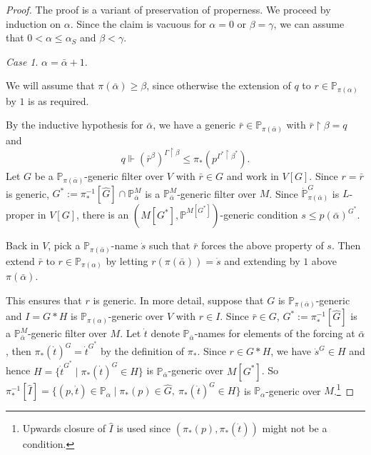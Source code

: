 \documentclass[a4paper, 11pt]{amsart}
\theoremstyle{remark}
\newtheorem*{case*}{Case}
\newcommand{\PP}{\mathbb{P}}
\begin{document}
\begin{proof} 
The proof is a variant of preservation of properness. 
We proceed by induction on $\alpha$. 
Since the claim is vacuous for $\alpha=0$ or $\beta=\gamma$, we can assume that $0<\alpha\leq\alpha_S$ and $\beta<\gamma$. 



\begin{case*} 
$\alpha=\bar{\alpha}+1$. 
\end{case*} 
We will assume that $\pi(\bar{\alpha})\geq\beta$, since otherwise the extension of $q$ to $r\in \PP_{\pi(\alpha)}$ by $1$ is as required. 

By the inductive hypothesis for $\bar{\alpha}$, we have a generic $\bar{r}\in\PP_{\pi(\bar{\alpha})}$ with $\bar{r}{\upharpoonright}\beta=q$ and 
$$q \Vdash (\bar{r}^\beta)^{\Gamma{\upharpoonright}\beta} \leq \pi_*(p^{\Gamma^*{\upharpoonright}\beta^*}).$$ 
Let $G$ be a $\PP_{\pi(\bar{\alpha})}$-generic filter over $V$ with $\bar{r}\in G$ and work in $V[G]$. 
Since $r=\bar{r}$ is generic, 
$G^*:=\pi_*^{-1}[\hat{G}]\cap \PP_{\bar{\alpha}}^M$ is a $\PP_{\bar{\alpha}}^M$-generic filter over $M$.
Since $\dot{\PP}_{\pi(\bar{\alpha})}^G$ is $L$-proper in $V[G]$, there is an $(M[G^*],\PP^{M[G^*]})$-generic condition 
$s\leq p(\bar{\alpha})^{G^*}$. 

Back in  $V$, pick a $\PP_{\pi(\bar{\alpha})}$-name $\dot{s}$ such that $\bar{r}$ forces the above property of $s$.  
Then extend $\bar{r}$ to $r\in \PP_{\pi(\alpha)}$ by letting $r(\pi(\bar{\alpha}))=\dot{s}$ and extending by $1$ above $\pi(\bar{\alpha})$. 

This ensures that $r$ is generic. 
In more detail, suppose that $G$ is $\PP_{\pi(\bar{\alpha})}$-generic  and $I=G{*}H$ is $\PP_{\pi(\alpha)}$-generic over $V$ with $r\in I$. 
Since $\bar{r}\in G$, $G^*:=\pi_*^{-1}[\hat{G}]$ is a $\PP_{\bar{\alpha}}^M$-generic filter over $M$. 
Let $\dot{t}$ denote $\PP_{\bar{\alpha}}$-names for elements of the forcing at $\bar{\alpha}$, then $\pi_*(\dot{t})^{G}= \dot{t}^{G^*}$ by the definition of $\pi_*$. 
Since $r\in G{*}H$, we have $\dot{s}^G\in H$ and hence $H=\{\dot{t}^{G^*}\mid \pi_*(\dot{t})^G\in H\}$ is $\PP_{\bar{\alpha}}$-generic over $M[G^*]$. 
So $\pi_*^{-1}[\hat{I}]=\{(p,\dot{t})\in \PP_\alpha\mid \pi_*(p)\in \hat{G},\ \pi_*(\dot{t})^G\in H\}$ is $\PP_\alpha$-generic over $M$.\footnote{Upwards closure of $\hat{I}$ is used since $(\pi_*(p),\pi_*(\dot{t}))$ might not be a condition. } 


\end{proof}
\end{document}
